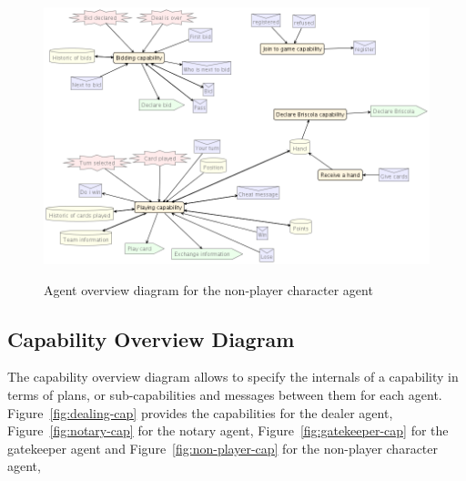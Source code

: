 \documentclass[a4paper]{article}
\begin{document}
\begin{figure}[htp]
  \includegraphics[keepaspectratio,scale=0.45]{pdt/images/detailed_design/non-player_character_overview_diagram.png}
  \label{fig:nonplay-char}
  \caption{Agent overview diagram for the non-player character agent}
\end{figure}
  

\subsection{Capability Overview Diagram}
The capability overview diagram allows to specify the internals of a capability in terms of plans, or sub-capabilities and messages between them for each agent. Figure~\ref{fig:dealing-cap} provides the capabilities for the dealer agent, Figure~\ref{fig:notary-cap} for the notary agent, Figure~\ref{fig:gatekeeper-cap} for the gatekeeper agent and Figure~\ref{fig:non-player-cap} for the non-player character agent, 
\end{document}

